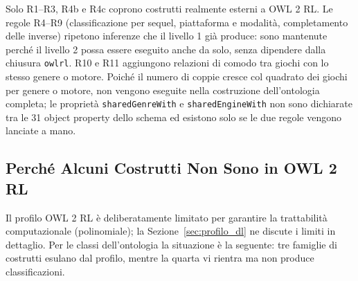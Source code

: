Solo R1--R3, R4b e R4c coprono costrutti realmente esterni a OWL 2 RL. Le regole R4--R9
(classificazione per sequel, piattaforma e modalit\`a, completamento delle inverse)
ripetono inferenze che il livello 1 gi\`a produce: sono mantenute perch\'e il livello 2
possa essere eseguito anche da solo, senza dipendere dalla chiusura \texttt{owlrl}.
R10 e R11 aggiungono relazioni di comodo tra giochi con lo stesso genere o motore. Poich\'e il numero di coppie
cresce col quadrato dei giochi per genere o motore, non vengono eseguite nella costruzione dell'ontologia
completa; le propriet\`a \texttt{sharedGenreWith} e \texttt{sharedEngineWith} non sono dichiarate tra le 31 object
property dello schema ed esistono solo se le due regole vengono lanciate a mano.

\subsection{Perch\'e Alcuni Costrutti Non Sono in OWL 2 RL}

Il profilo OWL 2 RL \`e deliberatamente limitato per garantire la trattabilit\`a
computazionale (polinomiale); la Sezione~\ref{sec:profilo_dl} ne discute i limiti in
dettaglio. Per le classi dell'ontologia la situazione \`e la seguente: tre famiglie di
costrutti esulano dal profilo, mentre la quarta vi rientra ma non produce classificazioni.

